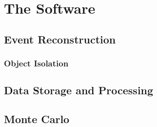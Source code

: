 \chapter{The Software}

\section{Event Reconstruction}

\subsection{Object Isolation}

\section{Data Storage and Processing}

\section{Monte Carlo}